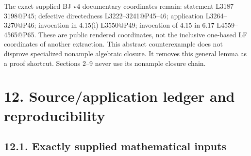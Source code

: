 \documentclass[
  10pt,
]{article}
\begin{document}
The exact supplied BJ v4 documentary coordinates remain: statement
L3187--3198@P45; defective directedness L3222--3241@P45--46; application
L3264--3270@P46; invocation in 4.15(i) L3550@P49; invocation of 4.15 in
6.17 L4559--4565@P65. These are public rendered coordinates, not the
inclusive one-based LF coordinates of another extraction. This abstract
counterexample does not disprove specialized nonample algebraic closure.
It removes this general lemma as a proof shortcut. Sections 2--9 never
use its nonample closure chain.

\section{12. Source/application ledger and
reproducibility}\label{sourceapplication-ledger-and-reproducibility}

\subsection{12.1. Exactly supplied mathematical
inputs}\label{exactly-supplied-mathematical-inputs}
\end{document}
